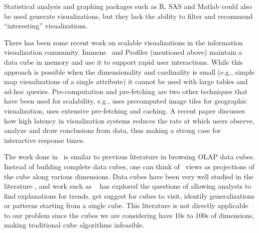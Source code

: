 Statistical analysis and graphing packages such as R, SAS and Matlab could also
be used generate visualizations, but they lack the ability to filter and
recommend ``interesting'' visualizations. 

There has been some recent work on
scalable visualizations in the information visualization community. Immens~\cite{2013-immens} and Profiler (mentioned above) maintain a data cube in memory and use it to support rapid user interactions. While this approach is possible when the dimensionality
and cardinality is small (e.g., simple map visualizations of a single
attribute) it cannot be used with large tables and ad-hoc queries.
Pre-computation and pre-fetching are two other techniques that have
been used for scalability, e.g., \cite{hotmap} uses
precomputed image tiles for geographic visualization,
\cite{doshi2003prefetching} uses extensive pre-fetching and caching. 
A recent paper \cite{2014-viz-latency} discusses how high
latency in visualization systems reduces the rate at which users observe,
analyze and draw conclusions from data, thus making a strong case for
interactive response times.



The work done in \SeeDB\ is similar to previous literature in
browsing OLAP data cubes. 
Instead of building complete data cubes,
one can think of \SeeDB\ views as projections of the cube along various
dimensions.
 Data cubes have been very well studied in the literature
\cite{DBLP:conf/SIGMOD/HarinarayanRU96, DBLP:jounral/DMKD/GrayCBLR97}, and work such as
~\cite{DBLP:conf/vldb/Sarawagi99, DBLP:conf/vldb/SatheS01,
DBLP:conf/vldb/Sarawagi00, DBLP:conf/SIGKDD/OrdonezC09} has explored the
questions of allowing analysts to find explanations for trends, get suggest for
cubes to visit, identify generalizations or patterns starting from a single
cube. 
This literature is not directly applicable to our problem since the cubes we
are considering have 10s to 100s of dimensions, making traditional cube
algorithms infeasible. 

